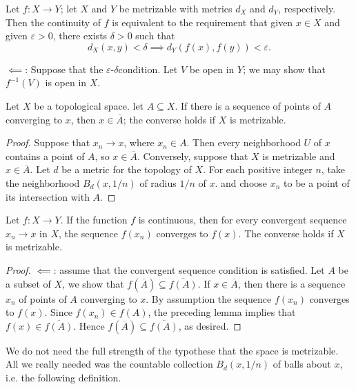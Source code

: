 \begin{theorem}
  Let \( f: X \to Y \);
  let \( X \) and \( Y \) be metrizable with metrics \( d_X \) and \( d_Y \), respectively.
  Then the continuity of \( f \) is equivalent to the requirement that given \( x \in X \) and given \( \varepsilon > 0 \), there exists \( \delta > 0  \) such that
  \[
    d_X(x, y) < \delta \implies d_Y(f(x), f(y)) < \varepsilon.
  \]
\end{theorem}
\begin{sketchproof}
  \( \impliedby \): Suppose that the \( \varepsilon \)-\( \delta \)condition.
  Let \( V \) be open in \( Y \); we may show that \( f^{-1}(V) \) is open in \( X \).
\end{sketchproof}

\begin{lemma}
  Let \( X \) be a topological space.
  let \( A \subseteq X \).
  If there is a sequence of points of \( A \) converging to \( x \), then \( x \in \overline{A} \);
  the converse holds if \( X \) is metrizable.
\end{lemma}
\begin{proof}
  Suppose that \( x_n \to x \), where \( x_n \in A \).
  Then every neighborhood \( U \) of \( x \) contains a point of \( A \), so \( x \in \overline{A} \).
  Conversely, suppose that \( X \) is metrizable and \( x \in \overline{A} \).
  Let \( d \) be a metric for the topology of \( X \).
  For each positive integer \( n \), take the neighborhood \( B_d(x, 1/n) \) of radius \( 1/n \) of \( x \).
  and choose \( x_n \) to be a point of its intersection with \( A \).
\end{proof}

\begin{theorem}
  Let \( f: X \to Y \).
  If the function \( f \) is continuous, then for every convergent sequence \( x_n \to x \) in \( X \), the sequence \( f(x_n) \) converges to \( f(x) \).
  The converse holds if \( X \) is metrizable.
\end{theorem}
\begin{proof}
  \( \impliedby \): assume that the convergent sequence condition is satisfied.
  Let \( A \) be a subset of \( X \), we show that \( f(\overline{A}) \subseteq \overline{f(A)} \).
  If \( x \in \overline{A} \), then there is a sequence \( x_n \) of points of \( A \) converging to \( x \).
  By assumption the sequence \( f(x_n) \) converges to \( f(x) \).
  Since \( f(x_n) \in f(A) \), the preceding lemma implies that \( f(x) \in \overline{f(A)} \).
  Hence \( f(\overline{A}) \subseteq \overline{f(A)} \), as desired.
\end{proof}
\begin{remark}
  We do not need the full strength of the typothese that the space is metrizable.
  All we really needed was the countable collection \( B_d(x, 1/n) \) of balls about \( x \), i.e. the following definition.
\end{remark}

